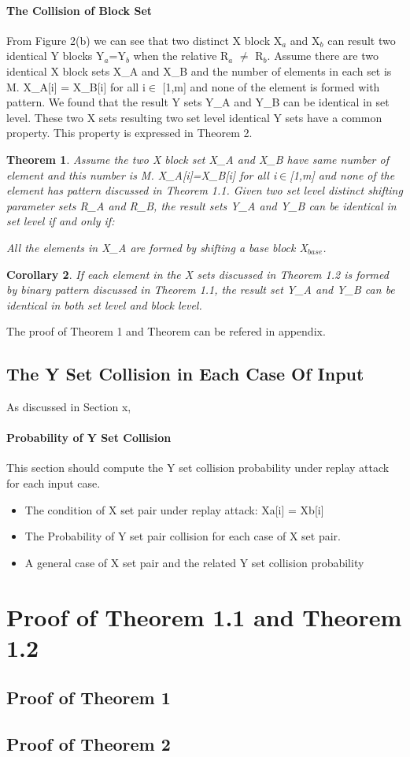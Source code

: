\documentclass{article}
\newtheorem{theorem}{Theorem}[section]
\newtheorem{corollary}[theorem]{Corollary}
\begin{document}
\paragraph{The Collision of Block Set}
From Figure 2(b) we can see that two distinct X block X$_a$ and X$_b$ can result two identical Y blocks Y$_a$=Y$_b$ when the relative R$_a$ $\neq$ R$_b$. Assume there are two identical X block sets X\_A and X\_B and the number of elements in each set is M. X\_A[i] = X\_B[i] for all i$\in$ [1,m] and none of the element is formed with pattern. We found that the result Y sets Y\_A and Y\_B can be identical in set level.  These two X sets resulting two set level identical Y sets have a common property. This property is expressed in Theorem 2.

\begin{theorem}
Assume the two X block set X\_A and X\_B have same number of element and this number is M. X\_A[i]=X\_B[i] for all i$\in$[1,m] and none of the element has pattern discussed in Theorem 1.1. Given two set level distinct shifting parameter sets R\_A and R\_B, the result sets Y\_A and Y\_B can be identical in set level if and only if:
	
	All the elements in X\_A are formed by shifting a base block X$_{base}$. 
\end{theorem}
\begin{corollary}
	If each element in the X sets discussed in Theorem 1.2 is formed by binary pattern discussed in Theorem 1.1, the result set Y\_A and Y\_B can be identical in both set level and block level.
\end{corollary}
The proof of Theorem 1 and Theorem can be refered in appendix.
\subsection{The Y Set Collision in Each Case Of Input} 
As discussed in Section x, 
\paragraph{Probability of Y Set Collision} 
This section should compute the Y set collision probability
under replay attack for each input case.  
\begin{itemize} 
	\item The condition of X set pair under replay attack: Xa[i] = Xb[i] 
	\item The Probability of Y set pair collision for each case of X set pair.  
	\item A general case of X set pair and the related Y set collision probability 
\end{itemize} 
\appendix
\section{Proof of Theorem 1.1 and Theorem 1.2}
\subsection{Proof of Theorem 1}
\subsection{Proof of Theorem 2}
\section{}
\end{document}
